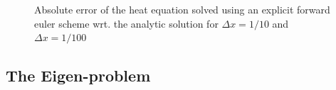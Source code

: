 \documentclass[reprint, english, nofootinbib]{revtex4-2}
\begin{document}
\begin{figure}[h!tb]
    \caption{\label{fig:fw euler PDE error}Absolute error of the heat equation solved using an explicit forward euler scheme wrt. the analytic solution for $\Delta x = 1/10$ and $\Delta x = 1/100$}
\end{figure}

\subsection{The Eigen-problem}
\end{document}
